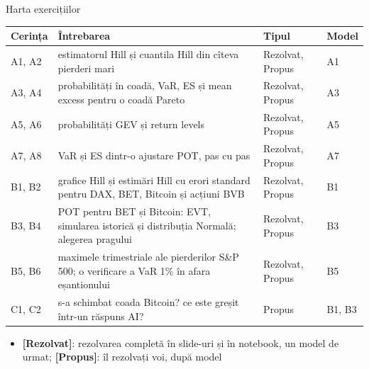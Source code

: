 \begin{frame}{Harta exercițiilor}
\itemsize{\small}
\begin{center}
\footnotesize
\begin{tabular}{>{\raggedright\arraybackslash}p{1.1cm}>{\raggedright\arraybackslash}p{7.5cm}>{\raggedright\arraybackslash}p{1.9cm}>{\raggedright\arraybackslash}p{1.4cm}}
\toprule
\textbf{Cerința} & \textbf{Întrebarea} & \textbf{Tipul} & \textbf{Model} \\
\midrule
A1, A2 & estimatorul Hill și cuantila Hill din cîteva pierderi mari & Rezolvat, Propus & A1 \\
A3, A4 & probabilități în coadă, VaR, ES și mean excess pentru o coadă Pareto & Rezolvat, Propus & A3 \\
A5, A6 & probabilități GEV și return levels & Rezolvat, Propus & A5 \\
A7, A8 & VaR și ES dintr-o ajustare POT, pas cu pas & Rezolvat, Propus & A7 \\
B1, B2 & grafice Hill și estimări Hill cu erori standard pentru DAX, BET, Bitcoin și acțiuni BVB & Rezolvat, Propus & B1 \\
B3, B4 & POT pentru BET și Bitcoin: EVT, simularea istorică și distribuția Normală; alegerea pragului & Rezolvat, Propus & B3 \\
B5, B6 & maximele trimestriale ale pierderilor S\&P 500; o verificare a VaR 1\% în afara eșantionului & Rezolvat, Propus & B5 \\
C1, C2 & s-a schimbat coada Bitcoin? ce este greșit într-un răspuns AI? & Propus & B1, B3 \\
\bottomrule
\end{tabular}
\end{center}
\begin{itemize}
    \item \textbf{[Rezolvat]}: rezolvarea completă în slide-uri și în notebook, un model de urmat; \textbf{[Propus]}: îl rezolvați voi, după model
\end{itemize}
\end{frame}

